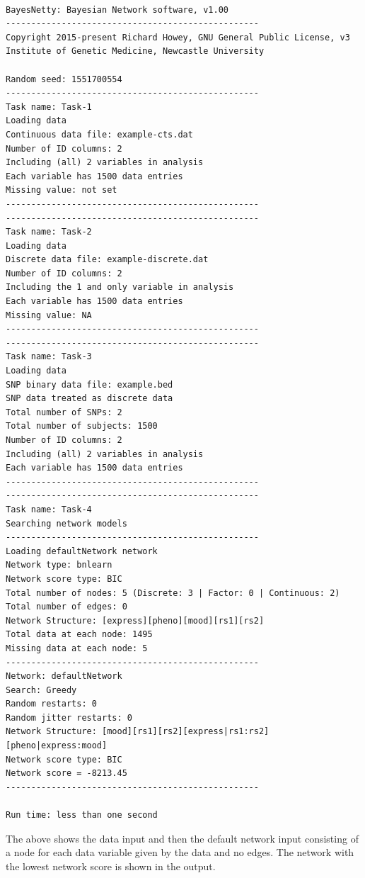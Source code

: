 \documentclass[a4paper,12pt]{article}
\begin{document}
\vspace{0.35cm} \begin{lstlisting}

BayesNetty: Bayesian Network software, v1.00
--------------------------------------------------
Copyright 2015-present Richard Howey, GNU General Public License, v3
Institute of Genetic Medicine, Newcastle University

Random seed: 1551700554
--------------------------------------------------
Task name: Task-1
Loading data
Continuous data file: example-cts.dat
Number of ID columns: 2
Including (all) 2 variables in analysis
Each variable has 1500 data entries
Missing value: not set
--------------------------------------------------
--------------------------------------------------
Task name: Task-2
Loading data
Discrete data file: example-discrete.dat
Number of ID columns: 2
Including the 1 and only variable in analysis
Each variable has 1500 data entries
Missing value: NA
--------------------------------------------------
--------------------------------------------------
Task name: Task-3
Loading data
SNP binary data file: example.bed
SNP data treated as discrete data
Total number of SNPs: 2
Total number of subjects: 1500
Number of ID columns: 2
Including (all) 2 variables in analysis
Each variable has 1500 data entries
--------------------------------------------------
--------------------------------------------------
Task name: Task-4
Searching network models
--------------------------------------------------
Loading defaultNetwork network
Network type: bnlearn
Network score type: BIC
Total number of nodes: 5 (Discrete: 3 | Factor: 0 | Continuous: 2)
Total number of edges: 0
Network Structure: [express][pheno][mood][rs1][rs2]
Total data at each node: 1495
Missing data at each node: 5
--------------------------------------------------
Network: defaultNetwork
Search: Greedy
Random restarts: 0
Random jitter restarts: 0
Network Structure: [mood][rs1][rs2][express|rs1:rs2][pheno|express:mood]
Network score type: BIC
Network score = -8213.45
--------------------------------------------------

Run time: less than one second

\end{lstlisting} \vspace{0.35cm}
The above shows the data input and then the default network input consisting of a node for each data variable given by the data and no edges. The network with the lowest network score is shown in the output. 

\end{document}

